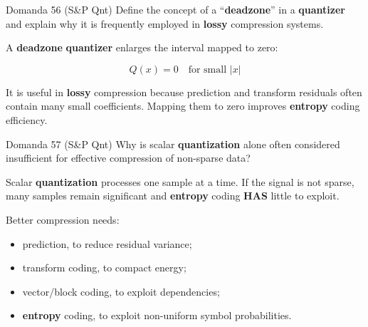 \begin{tcolorbox}[colback=white, colframe=gray!50, height=4.5cm, sharp corners]
\end{tcolorbox}
\begin{tcolorbox}[colback=white, colframe=gray!50, height=4.5cm, sharp corners]
\end{tcolorbox}



\begin{questionbox}{Domanda 56}
(S\&P Qnt) Define the concept of a “\textbf{deadzone}” in a \textbf{quantizer} and explain why it is frequently employed in \textbf{lossy} compression systems.
\end{questionbox}


A \textbf{deadzone} \textbf{quantizer} enlarges the interval mapped to zero:


$$
Q(x)=0 \quad \text{for small } |x|
$$


It is useful in \textbf{lossy} compression because prediction and transform residuals often contain many small coefficients. Mapping them to zero improves \textbf{entropy} coding efficiency.

\begin{tcolorbox}[colback=white, colframe=gray!50, height=4.5cm, sharp corners]
\end{tcolorbox}



\begin{questionbox}{Domanda 57}
(S\&P Qnt) Why is scalar \textbf{quantization} alone often considered insufficient for effective compression of non-sparse data?
\end{questionbox}


Scalar \textbf{quantization} processes one sample at a time. If the signal is not sparse, many samples remain significant and \textbf{entropy} coding \textbf{HAS} little to exploit.

Better compression needs:

\begin{itemize}
  \item prediction, to reduce residual variance;
  \item transform coding, to compact energy;
  \item vector/block coding, to exploit dependencies;
  \item \textbf{entropy} coding, to exploit non-uniform symbol probabilities.
\end{itemize}




